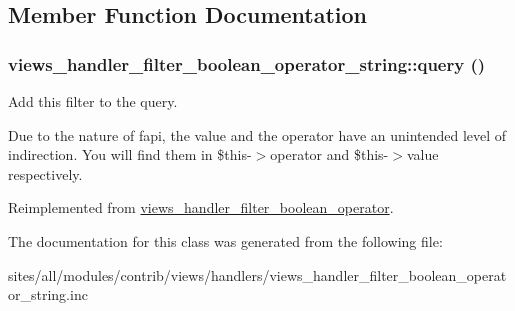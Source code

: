\subsection{Member Function Documentation}
\hypertarget{classviews__handler__filter__boolean__operator__string_d4d0444476749372e38591ad058ee1cd}{
\subsubsection[{query}]{\setlength{\rightskip}{0pt plus 5cm}views\_\-handler\_\-filter\_\-boolean\_\-operator\_\-string::query ()}}
\label{classviews__handler__filter__boolean__operator__string_d4d0444476749372e38591ad058ee1cd}


Add this filter to the query.

Due to the nature of fapi, the value and the operator have an unintended level of indirection. You will find them in \$this-$>$operator and \$this-$>$value respectively. 

Reimplemented from \hyperlink{classviews__handler__filter__boolean__operator_b3afc650701939c060e684d75fa2b21b}{views\_\-handler\_\-filter\_\-boolean\_\-operator}.

The documentation for this class was generated from the following file:\begin{CompactItemize}
\item 
sites/all/modules/contrib/views/handlers/views\_\-handler\_\-filter\_\-boolean\_\-operator\_\-string.inc\end{CompactItemize}
